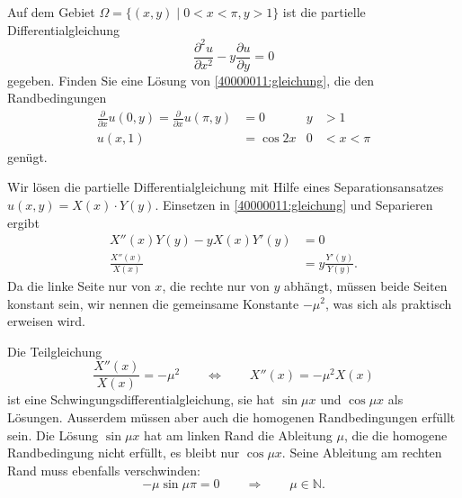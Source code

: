 Auf dem Gebiet $\Omega=\{(x,y)\;|\;0<x<\pi,y>1\}$
ist die partielle Differentialgleichung
\begin{equation}
\frac{\partial^2 u}{\partial x^2}-y\frac{\partial u}{\partial y}=0
\label{40000011:gleichung}
\end{equation}
gegeben.
Finden Sie eine Lösung von \eqref{40000011:gleichung}, die den
Randbedingungen
\begin{align*}
\frac{\partial}{\partial x}u(0,y)=
\frac{\partial}{\partial x}u(\pi,y)&=0&y&> 1\\
u(x,1)&=\cos2x&0&<x<\pi
\end{align*}
genügt.

\begin{loesung}
Wir lösen die partielle Differentialgleichung mit Hilfe eines 
Separationsansatzes $u(x,y)=X(x)\cdot Y(y)$.
Einsetzen in \eqref{40000011:gleichung} und Separieren ergibt
\begin{align*}
X''(x)Y(y)-yX(x)Y'(y)&=0\\
\frac{X''(x)}{X(x)}&=y\frac{Y'(y)}{Y(y)}.
\end{align*}
Da die linke Seite nur von $x$, die rechte nur von $y$ abhängt, müssen
beide Seiten konstant sein, wir nennen die gemeinsame Konstante $-\mu^2$,
was sich als praktisch erweisen wird.

Die Teilgleichung
\[
\frac{X''(x)}{X(x)}=-\mu^2
\qquad
\Leftrightarrow
\qquad
X''(x)=-\mu^2X(x)
\]
ist eine Schwingungsdifferentialgleichung, sie hat $\sin\mu x$ und $\cos\mu x$
als Lösungen.
Ausserdem müssen aber auch die homogenen Randbedingungen
erfüllt sein.
Die Lösung $\sin\mu x$ hat am linken Rand die Ableitung $\mu$,
die die homogene Randbedingung nicht erfüllt, es bleibt nur $\cos\mu x$.
Seine Ableitung am rechten Rand muss ebenfalls verschwinden:
\[
-\mu\sin\mu \pi=0
\qquad
\Rightarrow
\qquad
\mu\in\mathbb N.
\]


\end{loesung}
